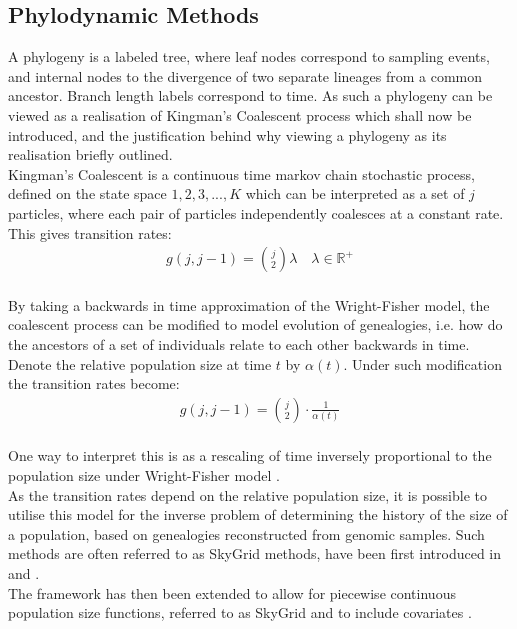 \documentclass{report}
\newcommand{\R}{\mathbb{R}}
\theoremstyle{definition}
\begin{document}
\subsection{Phylodynamic Methods}
A phylogeny is a labeled tree, where leaf nodes correspond to sampling events, and internal nodes to the divergence of two separate lineages from a common ancestor. Branch length labels correspond to time. As such a phylogeny can be viewed as a realisation of Kingman's Coalescent process which shall now be introduced, and the justification behind why viewing a phylogeny as its realisation briefly outlined.\\
Kingman's Coalescent is a continuous time markov chain stochastic process, defined on the state space ${1,2,3, ... ,K}$ which can be interpreted as a set of $j$ particles, where each pair of particles independently coalesces at a constant rate. This gives transition rates:
\begin{gather}
g(j, j-1) = \binom{j}{2}\lambda\quad\lambda\in\R^+
\end{gather}
\cite{kingman_coalescent_1982}\\
By taking a backwards in time approximation of the Wright-Fisher model, the coalescent process can be modified to model evolution of genealogies, i.e. how do the ancestors of a set of individuals relate to each other backwards in time. Denote the relative population size at time $t$ by $\alpha(t)$. Under such modification the transition rates become:
\begin{gather}
g(j, j-1) = \binom{j}{2}\cdot\frac{1}{\alpha(t)}
\end{gather}
\cite{griffiths_sampling_1994}\\
One way to interpret this is as a rescaling of time inversely proportional to the population size under Wright-Fisher model \cite{hein_gene_2004}.\\
As the transition rates depend on the relative population size, it is possible to utilise this model for the inverse problem of determining the history of the size of a population, based on genealogies reconstructed from genomic samples.
Such methods are often referred to as SkyGrid methods, have been first introduced in \cite{pybus_integrated_2000} and \cite{drummond_estimating_2002}.\\
The framework has then been extended to allow for piecewise continuous population size functions, referred to as SkyGrid \cite{gill_improving_2013} and to include covariates \cite{gill_understanding_2016}.
\end{document}
